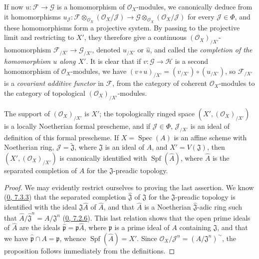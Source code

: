 If now $u:\mathscr{F}\to\mathscr{G}$ is a homomorphism of
$\mathscr{O}_X$-modules, we canonically deduce from it homomorphisms
$u_{\mathscr{J}}:
\mathscr{F}\otimes_{\mathscr{O}_X}(\mathscr{O}_X/\mathscr{J})
\to
\mathscr{G}\otimes_{\mathscr{O}_X}(\mathscr{O}_X/\mathscr{J})$
for every $\mathscr{J}\in\Phi$, and these homomorphisms form a
projective system. By passing to the projective limit and restricting
to $X'$, they therefore give a continuous
$(\mathscr{O}_X)_{/X'}$-homomorphism
$\mathscr{F}_{/X'}\to\mathscr{G}_{/X'}$, denoted $u_{/X'}$ or $\widehat u$,
and called the \emph{completion of the homomorphism $u$ along $X'$}. It
is clear that if $v:\mathscr{G}\to\mathscr{H}$ is a second homomorphism
of $\mathscr{O}_X$-modules, we have
$(v\circ u)_{/X'}=(v_{/X'})\circ(u_{/X'})$, so
$\mathscr{F}_{/X'}$ is a \emph{covariant additive functor} in
$\mathscr{F}$, from the category of coherent $\mathscr{O}_X$-modules to
the category of topological $(\mathscr{O}_X)_{/X'}$-modules.

\begin{proposition}[10.8.5]
\label{I.10.8.5}
The support of $(\mathscr{O}_X)_{/X'}$ is $X'$; the topologically
ringed space $(X',(\mathscr{O}_X)_{/X'})$ is a locally Noetherian
formal prescheme, and if $\mathscr{J}\in\Phi$, $\mathscr{J}_{/X'}$ is an
ideal of definition of this formal prescheme. If
$X=\operatorname{Spec}(A)$ is an affine scheme with Noetherian ring,
$\mathscr{J}=\widetilde{\mathfrak{J}}$, where $\mathfrak{J}$ is an ideal
of $A$, and $X'=V(\mathfrak{J})$, then
$(X',(\mathscr{O}_X)_{/X'})$ is canonically identified with
$\operatorname{Spf}(\widehat A)$, where $\widehat A$ is the separated
completion of $A$ for the $\mathfrak{J}$-preadic topology.
\end{proposition}

\begin{proof}
We may evidently restrict ourselves to proving the last assertion. We
know (\hyperref[0.7.3.3]{0, 7.3.3}) that the separated completion
$\widehat{\mathfrak{J}}$ of $\mathfrak{J}$ for the
$\mathfrak{J}$-preadic topology is identified with the ideal
$\mathfrak{J}\widehat A$ of $\widehat A$, and that $\widehat A$ is a
Noetherian $\widehat{\mathfrak{J}}$-adic ring such that
$\widehat A/\widehat{\mathfrak{J}}^n=A/\mathfrak{J}^n$
(\hyperref[0.7.2.6]{0, 7.2.6}). This last relation shows that the
open prime ideals of $\widehat A$ are the ideals
$\widehat{\mathfrak p}=\mathfrak p\widehat A$, where $\mathfrak p$ is a
prime ideal of $A$ containing $\mathfrak{J}$, and that we have
$\widehat{\mathfrak p}\cap A=\mathfrak p$, whence
$\operatorname{Spf}(\widehat A)=X'$. Since
$\mathscr{O}_X/\mathscr{J}^n=(A/\mathfrak{J}^n)^{\sim}$, the proposition
follows immediately from the definitions.
\end{proof}

